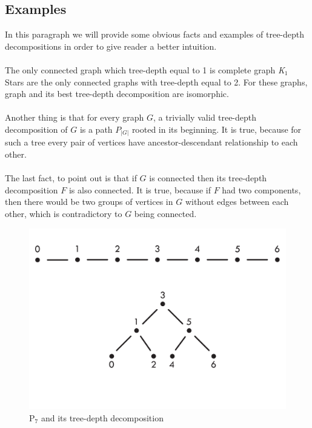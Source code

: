 \subsection{Examples}
In this paragraph we will provide some obvious facts and examples of tree-depth decompositions in order to give reader a better intuition.\\\\
The only connected graph which tree-depth equal to 1 is complete graph \emph{K$_{1}$}\\
Stars are the only connected graphs with tree-depth equal to 2.  For these graphs, graph and its best tree-depth decomposition are isomorphic.\\\\
Another thing is that for every graph $G$, a trivially valid tree-depth decomposition of $G$ is a path $P_{\left|G\right|}$ rooted in its beginning. It is true, because for such a tree every pair of vertices have ancestor-descendant relationship to each other.\\\\
The last fact, to point out is that if $G$ is connected then its tree-depth decomposition $F$ is also connected. It is true, because if $F$ had two components, then there would be two groups of vertices in $G$ without edges between each other, which is contradictory to $G$ being connected.
\begin{figure}[hbt!]
	\centering
	\includegraphics[scale=0.5,valign=t]{sciezka.pdf}
	\caption{P$_{7}$ and its tree-depth decomposition}
\end{figure}
\\\\\\\\
